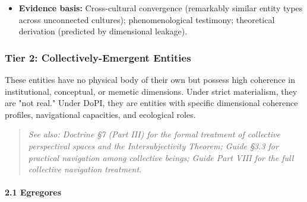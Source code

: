 \begin{itemize}[nosep,leftmargin=*]
  \item \textbf{Evidence basis:} Cross-cultural convergence (remarkably similar entity types across unconnected cultures); phenomenological testimony; theoretical derivation (predicted by dimensional leakage).
\end{itemize}


\bigskip\noindent\makebox[\textwidth]{\color{rulegray}\rule{5cm}{0.3pt}}\bigskip


\subsubsection*{Tier 2: Collectively-Emergent Entities}


These entities have no physical body of their own but possess high coherence in institutional, conceptual, or memetic dimensions. Under strict materialism, they are "not real." Under DoPI, they are entities with specific dimensional coherence profiles, navigational capacities, and ecological roles.


\begin{quote}
\itshape
\textit{See also: Doctrine §7 (Part III) for the formal treatment of collective perspectival spaces and the Intersubjectivity Theorem; Guide §3.3 for practical navigation among collective beings; Guide Part VIII for the full collective navigation treatment.}
\end{quote}


\paragraph*{2.1 Egregores}

